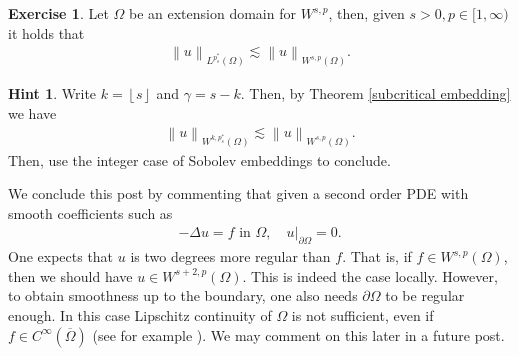 \documentclass[
    a4paper,
    DIV=14,
    abstract=true,
    numbers=noenddot
]
{scrartcl}
\theoremstyle{definition}
\newtheorem{exercise}{Exercise}
\newtheorem*{hint}{Hint}
\renewcommand{\norm}[1]{\left\lVert #1 \right\rVert}\renewcommand{\abs}[1]{\left| #1 \right|}
\newcommand\restr[2]{\left.#1\right|_{#2}}
\begin{document}
\begin{exercise}
  Let $\Omega $ be an extension domain for $W^{s,p}$, then, given $s>0, p \in [1, \infty)$ it holds that
  \begin{align*}
    \norm{u}_{L^{p_s^*}(\Omega )}\lesssim \norm{u}_{W^{s,p}(\Omega )}.
  \end{align*}
\end{exercise}
\begin{hint}
  Write $k=\left\lfloor s \right\rfloor$ and $\gamma =s-k$. Then, by Theorem \ref{subcritical embedding} we have
  \begin{align*}
    \norm{u}_{W^{k,p_s^*}(\Omega )}\lesssim \norm{u}_{W^{s,p}(\Omega )}.
  \end{align*}
  Then, use the integer case of Sobolev embeddings to conclude.

\end{hint}


We conclude this post by commenting that given a second order PDE with smooth coefficients such as
\begin{align*}
  - \Delta u =f \text{ in } \Omega , \quad \restr{u}{\partial \Omega }= 0.
\end{align*}
One expects that $u$ is two degrees more regular than $f$. That is, if $f \in W^{s,p}(\Omega )$, then we should have $u \in W^{s+2,p}(\Omega )$. This is indeed the case locally. However, to obtain smoothness up to the boundary, one also needs $\partial \Omega $  to be regular enough. In this case Lipschitz continuity of $\Omega $ is not sufficient, even if $f \in C^\infty(\overline{\Omega } )$ (see for example \cite{savare1998regularity}). We may comment on this later in a future post.







\end{document}
